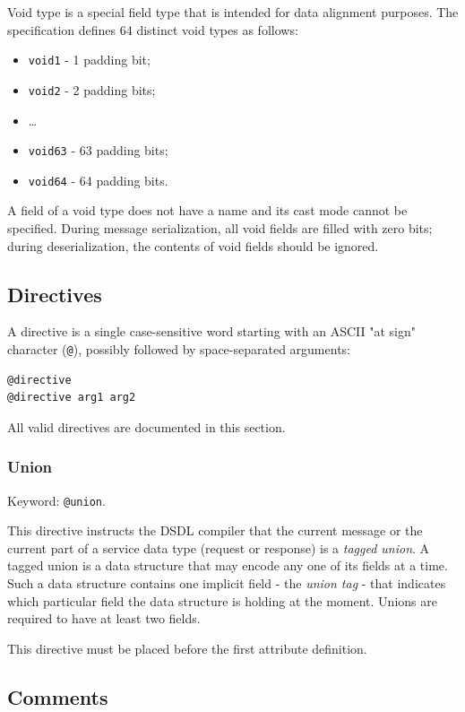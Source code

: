 Void type is a special field type that is intended for data alignment purposes.
The specification defines 64 distinct void types as follows:

\begin{itemize}
    \item \verb|void1| - 1 padding bit;
    \item \verb|void2| - 2 padding bits;
    \item \ldots
    \item \verb|void63| - 63 padding bits;
    \item \verb|void64| - 64 padding bits.
\end{itemize}

A field of a void type does not have a name and its cast mode cannot be specified.
During message serialization, all void fields are filled with zero bits;
during deserialization, the contents of void fields should be ignored.

\subsection{Directives}

A directive is a single case-sensitive word starting with an ASCII "at sign" character (\verb|@|),
possibly followed by space-separated arguments:

\begin{verbatim}
@directive
@directive arg1 arg2
\end{verbatim}

All valid directives are documented in this section.

\subsubsection{Union}

Keyword: \verb|@union|.

This directive instructs the DSDL compiler that the current message or the current part of a service data type
(request or response) is a \emph{tagged union}.
A tagged union is a data structure that may encode any one of its fields at a time.
Such a data structure contains one implicit field - the \emph{union tag} - that indicates which particular
field the data structure is holding at the moment.
Unions are required to have at least two fields.

This directive must be placed before the first attribute definition.

\subsection{Comments}

